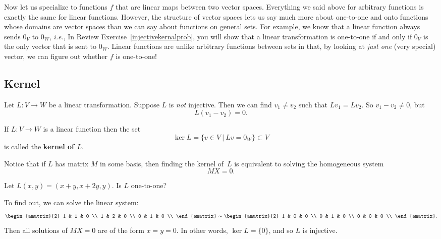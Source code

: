Now let us specialize to functions \(f\) that are linear maps between two vector spaces. Everything we said above for arbitrary functions is exactly the same for linear functions. However, the structure of vector spaces lets us say much more about one-to-one and onto functions whose domains are vector spaces than we can say about functions on general sets.  For example, we know that a linear function always sends $0_V$ to $0_W$, {\itshape i.e.},
In Review Exercise~\ref{injectivekernalprob}, you will show that a linear transformation is one-to-one if and only if $0_V$ is the only vector that is sent to $0_W$. Linear functions are unlike  arbitrary functions between sets in that, by looking at {\itshape just one} (very special) vector, we can figure out whether $f$ is one-to-one!  
\subsection{Kernel}
Let \(L \colon V \to W\) be a linear transformation. Suppose \(L\) is \emph{not} injective.  Then we can find $v_1 \neq v_2$ such that $Lv_1=Lv_2$.  So $v_1-v_2\neq 0$, but
\[
L(v_1-v_2)=0.
\]

\begin{definition}
If $L \colon V\rightarrow W$ is a linear function  then the set 
\[
\ker L = \{v\in V ~|~ Lv=0_W \}\subset V 
\]
is called the {\bfseries kernel of $L$}.
\end{definition}


Notice that if $L$ has matrix $M$ in some basis, then finding the kernel of~$L$ is equivalent to solving the homogeneous system 
\[
MX=0.
\]

\begin{example}
Let $L(x,y)=(x+y,x+2y,y)$.  Is $L$ one-to-one?

To find out, we can solve the linear system:
\[
\begin{amatrix}{2}
1 & 1 & 0 \\
1 & 2 & 0 \\
0 & 1 & 0 \\
\end{amatrix} \sim
\begin{amatrix}{2}
1 & 0 & 0 \\
0 & 1 & 0 \\
0 & 0 & 0 \\
\end{amatrix}.
\]
Then all solutions of $MX=0$ are of the form $x=y=0$.  In other words, $\ker L=\{0\}$, and so $L$ is injective.
\end{example}

